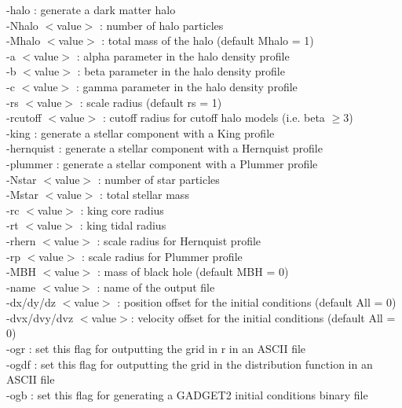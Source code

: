\documentclass[letterpaper,10pt]{article}
\begin{document}
-halo               : generate a dark matter halo\\
-Nhalo $<$value$>$      : number of halo particles\\
-Mhalo $<$value$>$      : total mass of the halo (default Mhalo = 1)\\
-a $<$value$>$          : alpha parameter in the halo density profile\\
-b $<$value$>$          : beta parameter in the halo density profile\\
-c $<$value$>$          : gamma parameter in the halo density profile\\
-rs $<$value$>$         : scale radius (default rs = 1)\\
-rcutoff $<$value$>$    : cutoff radius for cutoff halo models (i.e. beta $ \geq 3$)\\
-king               : generate a stellar component with a King profile\\
-hernquist          : generate a stellar component with a Hernquist profile\\
-plummer            : generate a stellar component with a Plummer profile\\
-Nstar $<$value$>$      : number of star particles\\
-Mstar $<$value$>$      : total stellar mass\\
-rc $<$value$>$         : king core radius\\
-rt $<$value$>$         : king tidal radius\\
-rhern $<$value$>$      : scale radius for Hernquist profile\\
-rp $<$value$>$         : scale radius for Plummer profile\\
-MBH $<$value$>$        : mass of black hole (default MBH = 0)\\
-name $<$value$>$       : name of the output file\\
-dx/dy/dz $<$value$>$   : position offset for the initial conditions (default All = 0)\\
-dvx/dvy/dvz $<$value$>$: velocity offset for the initial conditions (default All = 0)\\
-ogr                : set this flag for outputting the grid in r in an ASCII file\\
-ogdf               : set this flag for outputting the grid in the distribution function in an ASCII file\\
-ogb                : set this flag for generating a GADGET2 initial conditions binary file\\
\end{document}
